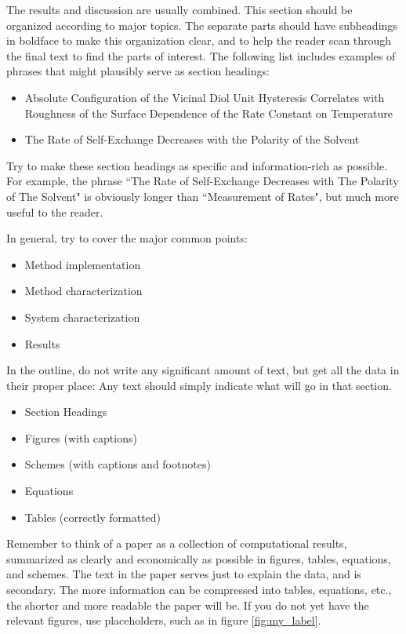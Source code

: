 \documentclass[twoside,twocolumn,9pt]{article}
\begin{document}
The results and discussion are usually combined. This section should be organized according to major topics. The separate parts should have subheadings in boldface to make this organization clear, and to help the reader scan through the final text to find the parts of interest. The following list includes examples of phrases that might plausibly serve as section headings:
\begin{itemize}
    \item Absolute Configuration of the Vicinal Diol Unit Hysteresis Correlates with Roughness of the Surface Dependence of the Rate Constant on Temperature
    \item The Rate of Self-Exchange Decreases with the Polarity of the Solvent
\end{itemize}
Try to make these section headings as specific and information-rich as possible. For example, the phrase ``The Rate of Self-Exchange Decreases with The Polarity of The Solvent" is obviously longer than ``Measurement of Rates", but much more useful to the reader.

In general, try to cover the major common points:
\begin{itemize}
    \item Method implementation
    \item Method characterization
    \item System characterization
    \item Results
\end{itemize}
In the outline, do not write any significant amount of text, but get all the data in their proper place: Any text should simply indicate what will go in that section.
\begin{itemize}
    \item Section Headings
    \item Figures (with captions)
    \item Schemes (with captions and footnotes) 
    \item Equations
    \item Tables (correctly formatted)
\end{itemize}
Remember to think of a paper as a collection of computational results, summarized as clearly and economically as possible in figures, tables, equations, and schemes. The text in the paper serves just to explain the data, and is secondary. The more information can be compressed into tables, equations, etc., the shorter and more readable the paper will be. If you do not yet have the relevant figures, use placeholders, such as in figure \ref{fig:my_label}.
\end{document}
